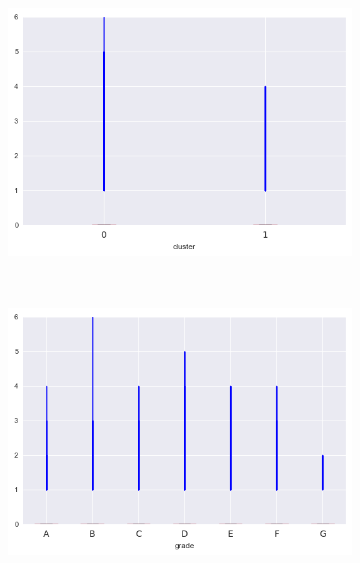 \begin{anexosenv}
\begin{figure}[t!]
\begin{subfigure}[t]{0.5\textwidth}
            \centerline{\includegraphics[width=1.05\textwidth]{img/delinq_2yrs_by_cluster}}
        \end{subfigure}%
        ~ 
        \begin{subfigure}[t]{0.5\textwidth}
            \centering
   
            \centerline{\includegraphics[width=1.05\textwidth]{img/delinq_2yrs_by_grade}}

        \end{subfigure}
\\
                \caption{recoveries}
        \begin{subfigure}[t]{0.5\textwidth}
            \centering


\end{subfigure}
\end{figure}
\end{anexosenv}
